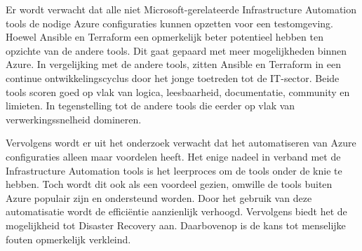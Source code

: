 Er wordt verwacht dat alle niet Microsoft-\newline{}gerelateerde Infrastructure Automation tools de nodige Azure configuraties kunnen opzetten voor een testomgeving. Hoewel Ansible en Terraform een opmerkelijk beter potentieel hebben ten opzichte van de andere tools. Dit gaat gepaard met meer mogelijkheden binnen Azure. In vergelijking met de andere tools, zitten Ansible en Terraform in een continue ontwikkelingscyclus door het jonge toetreden tot de IT-sector. Beide tools scoren goed op vlak van logica, leesbaarheid, documentatie, community en limieten. In tegenstelling tot de andere tools die eerder op vlak van verwerkingssnelheid domineren. 

Vervolgens wordt er uit het onderzoek verwacht dat het automatiseren van Azure configuraties alleen maar voordelen heeft. Het enige nadeel in verband met de Infrastructure Automation tools is het leerproces om de tools onder de knie te hebben. Toch wordt dit ook als een voordeel gezien, omwille de tools buiten Azure populair zijn en ondersteund worden. Door het gebruik van deze automatisatie wordt de efficiëntie aanzienlijk verhoogd. Vervolgens biedt het de mogelijkheid tot Disaster Recovery aan. Daarbovenop is de kans tot menselijke fouten opmerkelijk verkleind.


